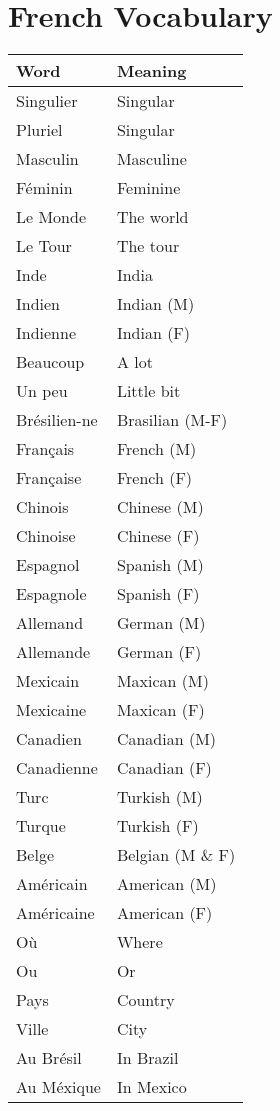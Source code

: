 \section{French Vocabulary}


\begin{longtable}{l  l}
\hline
Word		& Meaning	\\
\hline
\endhead
Singulier 	& Singular 	\\
Pluriel 	& Singular 	\\
Masculin	& Masculine	\\
F\'eminin	& Feminine	\\
Le Monde 	& The world 	\\
Le Tour		& The tour	\\
Inde		& India		\\
Indien		& Indian (M) 	\\
Indienne	& Indian (F)	\\
Beaucoup	& A lot		\\
Un peu		& Little bit	\\
Br\'esilien-ne	& Brasilian (M-F)	\\
Fran\c{c}ais	& French (M)	\\
Fran\c{c}aise	& French (F)	\\
Chinois		& Chinese (M)	\\
Chinoise	& Chinese (F)	\\
Espagnol	& Spanish (M)	\\
Espagnole	& Spanish (F)	\\
Allemand	& German (M)	\\
Allemande	& German (F)	\\
Mexicain	& Maxican (M)	\\
Mexicaine	& Maxican (F)	\\
Canadien	& Canadian (M)	\\
Canadienne	& Canadian (F)	\\
Turc		& Turkish (M)	\\
Turque		& Turkish (F)	\\
Belge		& Belgian (M \& F)	\\
Am\'ericain	& American (M)	\\
Am\'ericaine	& American (F)	\\
O\`u		& Where		\\
Ou		& Or		\\
Pays		& Country	\\
Ville		& City		\\
Au Br\'esil	& In Brazil	\\
Au M\'exique 	& In Mexico	\\

\end{longtable}
